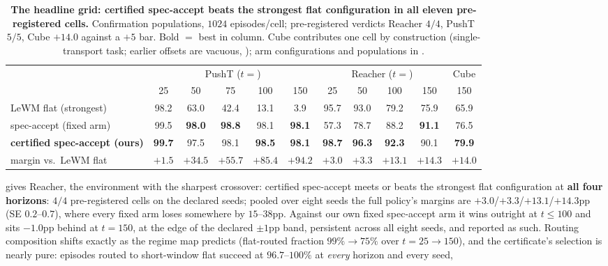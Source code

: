 \documentclass{article}
\newcommand{\ours}[1]{\textbf{#1}}
\begin{document}
\begin{table}[t]
\centering
\small
\setlength{\tabcolsep}{3.2pt}
\caption{\textbf{The headline grid: certified spec-accept beats the strongest flat
configuration in all eleven pre-registered cells.} Confirmation populations, $1024$
episodes/cell; pre-registered verdicts Reacher $4/4$, PushT $5/5$, Cube $+14.0$
against a $+5$ bar. Bold $=$ best in column. Cube contributes one cell by
construction (single-transport task; earlier offsets are vacuous,
); arm configurations and populations in
.}
\label{tab:grand}
\begin{tabular}{lccccc|cccc|c}
\toprule
& \multicolumn{5}{c|}{PushT ($t{=}$)} & \multicolumn{4}{c|}{Reacher ($t{=}$)} & Cube \\
& 25 & 50 & 75 & 100 & 150 & 25 & 50 & 100 & 150 & 150 \\
\midrule
LeWM flat (strongest)        & 98.2 & 63.0 & 42.4 & 13.1 & 3.9 & 95.7 & 93.0 & 79.2 & 75.9 & 65.9 \\
spec-accept (fixed arm)      & 99.5 & \ours{98.0} & \ours{98.8} & 98.1 & \ours{98.1} & 57.3 & 78.7 & 88.2 & \ours{91.1} & 76.5 \\
\ours{certified spec-accept (ours)} & \ours{99.7} & 97.5 & 98.1 & \ours{98.5} & \ours{98.1} & \ours{98.7} & \ours{96.3} & \ours{92.3} & 90.1 & \ours{79.9} \\
\midrule
margin vs.\ LeWM flat        & $+1.5$ & $+34.5$ & $+55.7$ & $+85.4$ & $+94.2$ & $+3.0$ & $+3.3$ & $+13.1$ & $+14.3$ & $+14.0$ \\
\bottomrule
\end{tabular}
\end{table}  gives Reacher, the environment
with the sharpest crossover: certified spec-accept meets or beats the strongest flat
configuration at \textbf{all four horizons}: $4/4$ pre-registered cells on the
declared seeds; pooled over eight seeds the full policy's margins are
$+3.0$/$+3.3$/$+13.1$/$+14.3$pp (SE $0.2$--$0.7$), where every fixed arm loses
somewhere by $15$--$38$pp.
Against our own fixed spec-accept arm it wins outright at $t{\le}100$ and sits
$-1.0$pp behind at $t{=}150$, at the edge of the declared $\pm1$pp band,
persistent across all eight seeds, and reported as such. Routing composition shifts
exactly as the regime map predicts (flat-routed fraction $99\%\to75\%$ over
$t{=}25\to150$), and the certificate's selection is nearly pure: episodes routed to
short-window flat succeed at $96.7$--$100\%$ at \emph{every} horizon and every seed,
\end{document}
